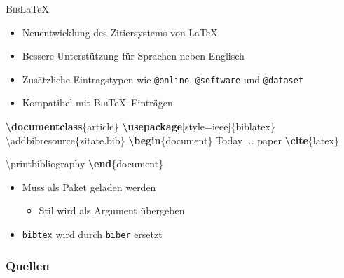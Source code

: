 \documentclass[aspectratio=169]{beamer}
\providecommand{\tightlist}{\setlength{\itemsep}{0pt}\setlength{\parskip}{0pt}}
\newenvironment{Shaded}{\begin{snugshade}}{\end{snugshade}}
\newcommand{\BuiltInTok}[1]{\textcolor[rgb]{0.25,0.67,0.19}{\textbf{#1}}}
\newcommand{\ExtensionTok}[1]{\textcolor[rgb]{0.25,0.67,0.19}{#1}}
\newcommand{\FunctionTok}[1]{\textcolor[rgb]{0.34,0.51,0.35}{#1}}
\newcommand{\KeywordTok}[1]{\textcolor[rgb]{0.25,0.67,0.19}{\textbf{#1}}}
\newcommand{\NormalTok}[1]{\textcolor[rgb]{0.19,0.19,0.19}{#1}}
\newenvironment{Shaded}{}{}
\newcommand\citestyle[1]{\textcolor{foreground-secondary}{\textsuperscript{#1}}}
\let\oldautocite\autocite
\renewcommand{\autocite}[1]{\citestyle{\oldautocite{#1}}}
\begin{document}
    \begin{frame}[fragile]{\textsc{Bib}\LaTeX}
    \protect\hypertarget{section-1}{}
    \begin{itemize}
    \tightlist
    \item
      Neuentwicklung des Zitiersystems von
      \LaTeX \autocite{ctan-biblatex}
    \item
      Bessere Unterstützung für Sprachen neben Englisch
      \autocite{ctan-biblatex}
    \item
      Zusätzliche Eintragstypen wie \texttt{@online}, \texttt{@software}
      und \texttt{@dataset} \autocite{biblatex}
    \item
      Kompatibel mit \textsc{Bib}\TeX~Einträgen \autocite{biblatex}
    \end{itemize}

    \begin{minipage}{0.66\textwidth}

\begin{Shaded}
\begin{Highlighting}[]
\BuiltInTok{\textbackslash{}documentclass}\NormalTok{\{}\ExtensionTok{article}\NormalTok{\}}
\BuiltInTok{\textbackslash{}usepackage}\NormalTok{[style=ieee]\{}\ExtensionTok{biblatex}\NormalTok{\}}
\FunctionTok{\textbackslash{}addbibresource}\NormalTok{\{zitate.bib\}}
\KeywordTok{\textbackslash{}begin}\NormalTok{\{}\ExtensionTok{document}\NormalTok{\}}
\NormalTok{\textasciigrave{}\textasciigrave{}Today ... paper\textquotesingle{}\textquotesingle{} }
\KeywordTok{\textbackslash{}cite}\NormalTok{\{}\ExtensionTok{latex}\NormalTok{\}}

\FunctionTok{\textbackslash{}printbibliography}
\KeywordTok{\textbackslash{}end}\NormalTok{\{}\ExtensionTok{document}\NormalTok{\}}
\end{Highlighting}
\end{Shaded}

    \end{minipage}\begin{minipage}{0.33\textwidth}

    \begin{itemize}
    \tightlist
    \item
      Muss als Paket geladen werden \autocite{biblatex}

      \begin{itemize}
      \tightlist
      \item
        Stil wird als Argument übergeben
      \end{itemize}
    \item
      \texttt{bibtex} wird durch \texttt{biber} ersetzt
      \autocite{biblatex}
    \end{itemize}

    \end{minipage}
    \end{frame}

        \begin{frame}[allowframebreaks]
            \frametitle{Quellen}
            \printbibliography[heading=none]
    \end{frame}
    
    
\end{document}
